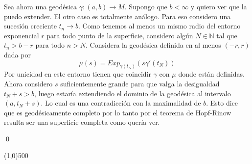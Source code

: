 \documentclass{article}
\theoremstyle{plain} %
\theoremstyle{definition}
\begin{document}
	Sea ahora una geodésica $\gamma:(a,b) \to M$. Supongo que $b<\infty$ y quiero ver que la puedo extender. El otro caso es totalmente análogo. Para eso considero una sucesión creciente $t_n \to b$. Como tenemos al menos un mismo radio del entorno exponencial $r$ para todo punto de la superficie, considero algún $N \in \mathbb N$ tal que $t_n > b-r$ para todo $n>N$. Considera la geodésica definida en al menos $(-r,r)$ dada por
	\[ \mu(s)=Exp_{\gamma(t_{N})}(s\gamma'(t_{N})) \]
	Por unicidad en este entorno tienen que coincidir $\gamma$ con $\mu$ donde están definidas. Ahora considero $s$ suficientemente grande para que valga la desigualdad $t_N + s > b$, luego estaría extendiendo el dominio de la geodésica al intervalo $(a,t_N+s)$. Lo cual es una contradicción con la maximalidad de $b$. Esto dice que es geodésicamente completo por lo tanto por el teorema de Hopf-Rinow resulta ser una superficie completa como quería ver.
	
	
	
	\qed
	
	\line(1,0){500}
	
	\bigskip
	
\end{document}
